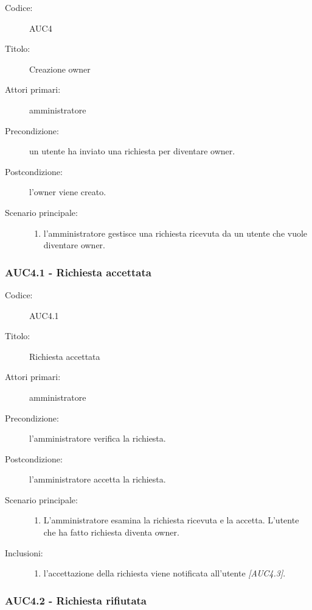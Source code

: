 \documentclass[../analisi-dei-requisiti.tex]{subfiles}
\begin{document}
\begin{description}
  \item[Codice:] AUC4
  \item[Titolo:] Creazione owner
  \item[Attori primari:] amministratore
  \item[Precondizione:] un utente ha inviato una richiesta per diventare owner.
  \item[Postcondizione:] l'owner viene creato.
  \item[Scenario principale:]
  \begin{enumerate}
    \item l'amministratore gestisce una richiesta ricevuta da un utente che vuole diventare owner.
  \end{enumerate}
\end{description}


\subsubsection{AUC4.1 - Richiesta accettata}%
\label{subsub:AUC4.1}

\begin{description}
  \item[Codice:] AUC4.1
  \item[Titolo:] Richiesta accettata
  \item[Attori primari:] amministratore
  \item[Precondizione:] l'amministratore verifica la richiesta.
  \item[Postcondizione:] l'amministratore accetta la richiesta.
  \item[Scenario principale:]
  \begin{enumerate}
    \item L'amministratore esamina la richiesta ricevuta e la accetta. L'utente che ha fatto richiesta diventa owner.
  \end{enumerate}
  \item[Inclusioni:]
  \begin{enumerate}
    \item l'accettazione della richiesta viene notificata all'utente \emph{[AUC4.3]}.
  \end{enumerate}
\end{description}

\subsubsection{AUC4.2 - Richiesta rifiutata}%
\label{subsub:AUC4.2}
\end{document}
